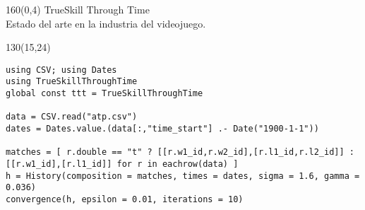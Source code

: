 \documentclass[shownotes,aspectratio=169]{beamer}
\begin{document}
\begin{frame}
\begin{textblock}{160}(0,4)
\centering \LARGE TrueSkill Through Time \\
\large Estado del arte en la industria del videojuego.
\end{textblock}


\begin{textblock}{130}(15,24)
\begin{lstlisting}[backgroundcolor=\color{black!10}]
using CSV; using Dates
using TrueSkillThroughTime
global const ttt = TrueSkillThroughTime

data = CSV.read("atp.csv")
dates = Dates.value.(data[:,"time_start"] .- Date("1900-1-1"))

matches = [ r.double == "t" ? [[r.w1_id,r.w2_id],[r.l1_id,r.l2_id]] : [[r.w1_id],[r.l1_id]] for r in eachrow(data) ]
h = History(composition = matches, times = dates, sigma = 1.6, gamma = 0.036)
convergence(h, epsilon = 0.01, iterations = 10)
\end{lstlisting}
\end{textblock}


\end{frame}
\end{document}
